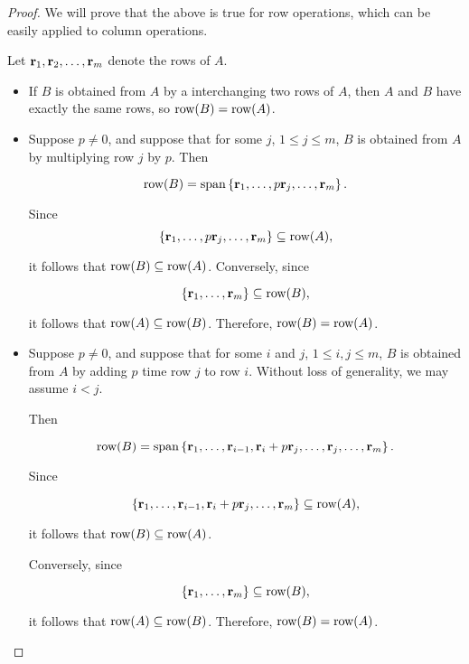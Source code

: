 \begin{proof}
We will prove that the above is true for row operations, which can be easily applied to column operations. 

Let $\mbox{\bf r}_1, \mbox{\bf r}_2, \ldots, \mbox{\bf r}_m$ denote the rows of $A$.

\begin{itemize}
\item If $B$ is obtained from $A$ by a interchanging two rows of $A$, then
$A$ and $B$ have exactly the same rows, so $\mbox{\rm row}(B)=\mbox{\rm row}(A)$.

\item
Suppose $p\neq 0$, and suppose that for some $j$, $1\leq j\leq m$,
$B$ is obtained from $A$ by multiplying row $j$ by $p$.
Then 

\[ \func{row}(B)=\sspan\set{\vect{r}_1, \ldots, 
p\vect{r}_{j}, \ldots, \vect{r}_m}.  \]

Since
\[ \left\{\mbox{\bf r}_1, \ldots, 
p\mbox{\bf r}_{j}, \ldots, \mbox{\bf r}_m\right\} \subseteq\mbox{\rm row}(A),\]

it follows that $\mbox{\rm row}(B)\subseteq\mbox{\rm row}(A)$.
Conversely, since

\[ \left\{\mbox{\bf r}_1, \ldots, \mbox{\bf r}_m\right\}\subseteq\mbox{\rm row}(B),\]

it follows that $\mbox{\rm row}(A)\subseteq\mbox{\rm row}(B)$.
Therefore, $\mbox{\rm row}(B)=\mbox{\rm row}(A)$.

\item
Suppose $p\neq 0$, and suppose that for some $i$ and $j$,
$1\leq i,j\leq m$,
$B$ is obtained from $A$ by adding $p$ time row $j$ to row $i$.
Without loss of generality, we may assume $i<j$.

Then 

\[ \func{row}(B)=\sspan\set{\vect{r}_1, \ldots, \vect{r}_{i-1},
\vect{r}_i+p\vect{r}_j, \ldots,\vect{r}_j,\ldots, \vect{r}_m}.  \]

Since

\[ \left\{\mbox{\bf r}_1, \ldots, \mbox{\bf r}_{i-1}, 
\mbox{\bf r}_i+p\mbox{\bf r}_{j}, \ldots, \mbox{\bf r}_m\right\} \subseteq\mbox{\rm row}(A),\]

it follows that $\mbox{\rm row}(B)\subseteq\mbox{\rm row}(A)$.

Conversely, since

\[ \left\{\mbox{\bf r}_1, \ldots, \mbox{\bf r}_m\right\}\subseteq\mbox{\rm row}(B),\]

it follows that $\mbox{\rm row}(A)\subseteq\mbox{\rm row}(B)$.
Therefore, $\mbox{\rm row}(B)=\mbox{\rm row}(A)$.
\end{itemize}
\end{proof}

